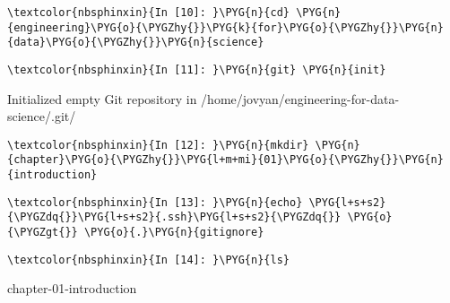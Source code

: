 \documentclass[letterpaper,10pt,english]{sphinxmanual}
\begin{document}
%
\begin{Verbatim}[commandchars=\\\{\}]
\textcolor{nbsphinxin}{In [10]: }\PYG{n}{cd} \PYG{n}{engineering}\PYG{o}{\PYGZhy{}}\PYG{k}{for}\PYG{o}{\PYGZhy{}}\PYG{n}{data}\PYG{o}{\PYGZhy{}}\PYG{n}{science}
\end{Verbatim}

%
\begin{Verbatim}[commandchars=\\\{\}]
\textcolor{nbsphinxin}{In [11]: }\PYG{n}{git} \PYG{n}{init}
\end{Verbatim}



%
\begin{OriginalVerbatim}[commandchars=\\\{\}]
Initialized empty Git repository in /home/jovyan/engineering-for-data-science/.git/
\end{OriginalVerbatim}
\relax

%
\begin{Verbatim}[commandchars=\\\{\}]
\textcolor{nbsphinxin}{In [12]: }\PYG{n}{mkdir} \PYG{n}{chapter}\PYG{o}{\PYGZhy{}}\PYG{l+m+mi}{01}\PYG{o}{\PYGZhy{}}\PYG{n}{introduction}
\end{Verbatim}

%
\begin{Verbatim}[commandchars=\\\{\}]
\textcolor{nbsphinxin}{In [13]: }\PYG{n}{echo} \PYG{l+s+s2}{\PYGZdq{}}\PYG{l+s+s2}{.ssh}\PYG{l+s+s2}{\PYGZdq{}} \PYG{o}{\PYGZgt{}} \PYG{o}{.}\PYG{n}{gitignore}
\end{Verbatim}

%
\begin{Verbatim}[commandchars=\\\{\}]
\textcolor{nbsphinxin}{In [14]: }\PYG{n}{ls}
\end{Verbatim}



%
\begin{OriginalVerbatim}[commandchars=\\\{\}]
chapter-01-introduction
\end{OriginalVerbatim}
\relax
\end{document}
